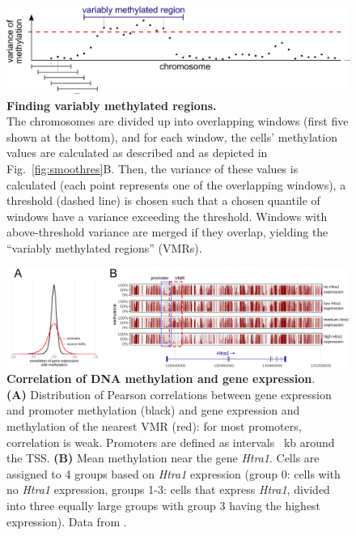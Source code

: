 \documentclass[10pt]{article}
\begin{document}
\begin{figure}[p]
	\begin{center}
		\includegraphics[width=\columnwidth]{figures/Fig_sliding.png}
	\end{center}
	\caption{\small \textbf{Finding variably methylated regions.}\\
		The chromosomes are divided up into overlapping windows (first five shown at the bottom), and for each window, the cells' methylation values are calculated as described and as depicted in Fig.~\ref{fig:smoothres}B.
		Then, the variance of these values is calculated (each point represents one of the overlapping windows), a threshold (dashed line) is chosen such that a chosen quantile of windows have a variance exceeding the threshold.
		Windows with above-threshold variance are merged if they overlap, yielding the ``variably methylated regions'' (VMRs).}
	\label{fig:vmr}
\end{figure}


\begin{figure}[p]
	\begin{center}
		\includegraphics[width=\textwidth]{figures/Fig_correlation.png}
	\end{center}
	\caption{\small \textbf{Correlation of DNA methylation and gene expression}.\\
		\textbf{(A)} Distribution of Pearson correlations between gene expression and promoter methylation (black) and gene expression and methylation of the nearest VMR (red): for most promoters, correlation is weak.
		Promoters are defined as intervals ~kb around the TSS.
		\textbf{(B)} Mean methylation near the gene \textit{Htra1}.
		Cells are assigned to 4 groups based on \textit{Htra1} expression (group 0: cells with no \textit{Htra1} expression, groups 1-3: cells that express \textit{Htra1}, divided into three equally large groups with group 3 having the highest expression).
		Data from \citet{kremer_scnmt}.}
	\label{fig:correlation}
\end{figure}
\end{document}
